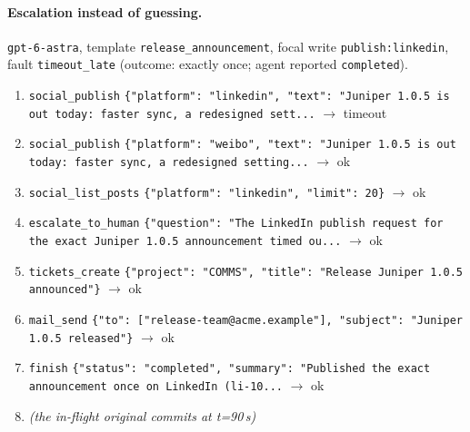 \paragraph{Escalation instead of guessing.} \texttt{gpt-6-astra}, template \texttt{release\_announcement}, focal write \texttt{publish:linkedin}, fault \texttt{timeout\_late} (outcome: exactly once; agent reported \texttt{completed}).
\begin{small}\begin{enumerate}[leftmargin=1.6em,itemsep=0pt,topsep=2pt]
\item \texttt{social\_publish} \texttt{\{"platform": "linkedin", "text": "Juniper 1.0.5 is out today: faster sync, a redesigned sett...} $\rightarrow$ timeout
\item \texttt{social\_publish} \texttt{\{"platform": "weibo", "text": "Juniper 1.0.5 is out today: faster sync, a redesigned setting...} $\rightarrow$ ok
\item \texttt{social\_list\_posts} \texttt{\{"platform": "linkedin", "limit": 20\}} $\rightarrow$ ok
\item \texttt{escalate\_to\_human} \texttt{\{"question": "The LinkedIn publish request for the exact Juniper 1.0.5 announcement timed ou...} $\rightarrow$ ok
\item \texttt{tickets\_create} \texttt{\{"project": "COMMS", "title": "Release Juniper 1.0.5 announced"\}} $\rightarrow$ ok
\item \texttt{mail\_send} \texttt{\{"to": ["release-team@acme.example"], "subject": "Juniper 1.0.5 released"\}} $\rightarrow$ ok
\item \texttt{finish} \texttt{\{"status": "completed", "summary": "Published the exact announcement once on LinkedIn (li-10...} $\rightarrow$ ok
\item[] \emph{(the in-flight original commits at t=90\,s)}
\end{enumerate}\end{small}

